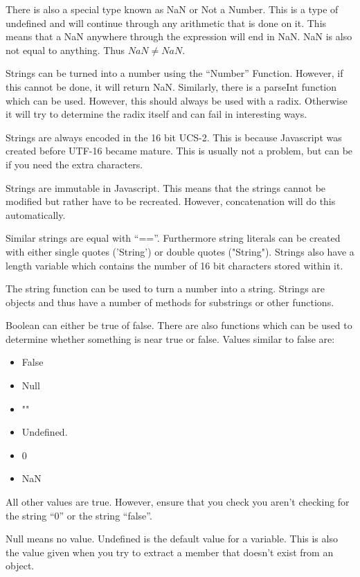 			There is also a special type known as NaN or Not a Number.
			This is a type of undefined and will continue through any arithmetic that is done on it.
			This means that a NaN anywhere through the expression will end in NaN.
			NaN is also not equal to anything.
			Thus $NaN \ne NaN$.

			Strings can be turned into a number using the ``Number'' Function.
			However, if this cannot be done, it will return NaN.
			Similarly, there is a parseInt function which can be used.
			However, this should always be used with a radix.
			Otherwise it will try to determine the radix itself and can fail in interesting ways.

			Strings are always encoded in the 16 bit UCS-2.
			This is because Javascript was created before UTF-16 became mature.
			This is usually not a problem, but can be if you need the extra characters.

			Strings are immutable in Javascript.
			This means that the strings cannot be modified but rather have to be recreated.
			However, concatenation will do this automatically.

			Similar strings are equal with ``==''.
			Furthermore string literals can be created with either single quotes ('String') or double quotes ("String").
			Strings also have a length variable which contains the number of 16 bit characters stored within it.

			The string function can be used to turn a number into a string.
			Strings are objects and thus have a number of methods for substrings or other functions.

			Boolean can either be true of false.
			There are also functions which can be used to determine whether something is near true or false.
			Values similar to false are:
			\begin{itemize}
				\item False
				\item Null
				\item ""
				\item Undefined.
				\item 0
				\item NaN
			\end{itemize}
			All other values are true.
			However, ensure that you check you aren't checking for the string ``0'' or the string ``false''.

			Null means no value.
			Undefined is the default value for a variable.
			This is also the value given when you try to extract a member that doesn't exist from an object.

